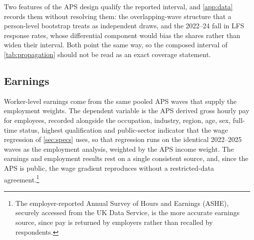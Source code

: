 Two features of the APS design qualify the reported interval, and \cref{app:data} records them without resolving them: the overlapping-wave structure that a person-level bootstrap treats as independent draws, and the 2022--24 fall in LFS response rates, whose differential component would bias the shares rather than widen their interval. Both point the same way, so the composed interval of \cref{tab:propagation} should not be read as an exact coverage statement.

\subsection{Earnings}\label{sec:earnings}

Worker-level earnings come from the same pooled APS waves that supply the employment weights. The dependent variable is the APS derived gross hourly pay for employees, recorded alongside the occupation, industry, region, age, sex, full-time status, highest qualification and public-sector indicator that the wage regression of \cref{sec:specs} uses, so that regression runs on the identical 2022--2025 waves as the employment analysis, weighted by the APS income weight. The earnings and employment results rest on a single consistent source, and, since the APS is public, the wage gradient reproduces without a restricted-data agreement.\footnote{The employer-reported Annual Survey of Hours and Earnings (ASHE), securely accessed from the UK Data Service, is the more accurate earnings source, since pay is returned by employers rather than recalled by respondents.}
